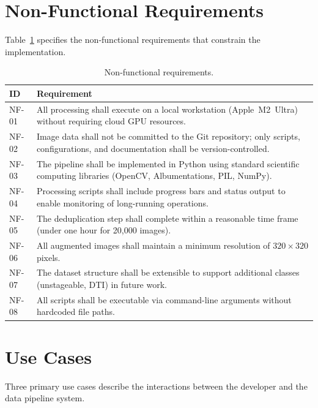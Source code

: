 \documentclass[a4paper,12pt,twoside]{report}
\begin{document}
\section{Non-Functional Requirements}
\label{sec:nonfunc-req}

Table~\ref{tab:nonfunctional-req} specifies the non-functional requirements that
constrain the implementation.

\begin{table}[htbp]
  \centering
  \caption{Non-functional requirements.}
  \label{tab:nonfunctional-req}
  \begin{tabularx}{\textwidth}{lX}
    \toprule
    \textbf{ID} & \textbf{Requirement} \\
    \midrule
    NF-01 & All processing shall execute on a local workstation (Apple~M2~Ultra)
            without requiring cloud GPU resources. \\
    NF-02 & Image data shall not be committed to the Git repository; only scripts,
            configurations, and documentation shall be version-controlled. \\
    NF-03 & The pipeline shall be implemented in Python using standard scientific
            computing libraries (OpenCV, Albumentations, PIL, NumPy). \\
    NF-04 & Processing scripts shall include progress bars and status output to
            enable monitoring of long-running operations. \\
    NF-05 & The deduplication step shall complete within a reasonable time frame
            (under one hour for 20,000 images). \\
    NF-06 & All augmented images shall maintain a minimum resolution of
            $320 \times 320$ pixels. \\
    NF-07 & The dataset structure shall be extensible to support additional
            classes (unstageable, DTI) in future work. \\
    NF-08 & All scripts shall be executable via command-line arguments without
            hardcoded file paths. \\
    \bottomrule
  \end{tabularx}
\end{table}

\section{Use Cases}
\label{sec:use-cases}

Three primary use cases describe the interactions between the developer and the
data pipeline system.
\end{document}
